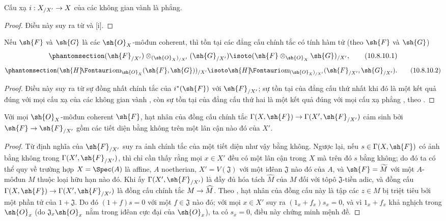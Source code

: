 \documentclass[oneside]{amsart}
\makeatletter
\newcommand{\ega@arrow}[2]{\mathchoice{#1}{#2}{#2}{#2}}
\renewcommand{\to}{\ega@arrow{\longrightarrow}{\rightarrow}}
\newcommand*{\ega@sheafop}[3]{\sh{#1}#2\textup{\kern-2.2pt{\Fontauri\slshape #3}}}
\newcommand*{\shHom}{\ega@sheafop{H}{}{om}}
\let\EGAOriginalLabel\label
\renewcommand{\label}[1]{\phantomsection\EGAOriginalLabel{#1}}
\makeatother
\begin{document}
\begin{corollary}[10.8.9]
\label{I.10.8.9}
Cấu xạ $i:X_{/X'}\to X$ của các không gian vành là phẳng.
\end{corollary}

\begin{proof}
Điều này suy ra từ  và [i].
\end{proof}

\begin{corollary}[10.8.10]
\label{I.10.8.10}
Nếu $\sh{F}$ và $\sh{G}$ là các $\sh{O}_X$-môđun coherent, thì tồn tại các đẳng cấu chính tắc có tính hàm tử (theo $\sh{F}$ và $\sh{G}$)
\[
\label{I.10.8.10.1}
  (\sh{F}_{/X'})\otimes_{(\sh{O}_X)_{/X'}}(\sh{G}_{/X'})\isoto(\sh{F}\otimes_{\sh{O}_X}\sh{G})_{/X'},
  \tag{10.8.10.1}
\]
\[
\label{I.10.8.10.2}
  (\shHom_{\sh{O}_X}(\sh{F},\sh{G}))_{/X'}\isoto\shHom_{(\sh{O}_X)_{/X'}}(\sh{F}_{/X'},\sh{G}_{/X'}).
  \tag{10.8.10.2}
\]
\end{corollary}

\begin{proof}
Điều này suy ra từ sự đồng nhất chính tắc của $i^*(\sh{F})$ với $\sh{F}_{/X'}$; sự tồn tại của đẳng cấu thứ nhất khi đó là một kết quả đúng với mọi cấu xạ của các không gian vành , còn sự tồn tại của đẳng cấu thứ hai là một kết quả đúng với mọi cấu xạ phẳng , theo .
\end{proof}

\begin{proposition}[10.8.11]
\label{I.10.8.11}
Với mọi $\sh{O}_X$-môđun coherent $\sh{F}$, hạt nhân của đồng cấu chính tắc $\Gamma(X,\sh{F})\to\Gamma(X',\sh{F}_{/X'})$ cảm sinh bởi $\sh{F}\to\sh{F}_{/X'}$ gồm các tiết diện bằng không trên một lân cận nào đó của $X'$.
\end{proposition}

\begin{proof}
Từ định nghĩa của $\sh{F}_{/X'}$ suy ra ảnh chính tắc của một tiết diện như vậy bằng không.
Ngược lại, nếu $s\in\Gamma(X,\sh{F})$ có ảnh bằng không trong $\Gamma(X',\sh{F}_{/X'})$, thì chỉ cần thấy rằng mọi $x\in X'$ đều có một lân cận trong $X$ mà trên đó $s$ bằng không; do đó ta có thể quy về trường hợp $X=\Spec(A)$ là affine, $A$ noetherian, $X'=V(\mathfrak{J})$ với một iđêan $\mathfrak{J}$ nào đó của $A$, và $\sh{F}=\widetilde{M}$ với một $A$-môđun $M$ thuộc loại hữu hạn nào đó.
Khi ấy $\Gamma(X',\sh{F}_{/X'})$ là đầy đủ hóa tách $\widehat{M}$ của $M$ đối với tôpô $\mathfrak{J}$-tiền adic, và đồng cấu $\Gamma(X,\sh{F})\to\Gamma(X',\sh{F}_{/X'})$ là đồng cấu chính tắc $M\to\widehat{M}$.
Theo , hạt nhân của đồng cấu này là tập các $z\in M$ bị triệt tiêu bởi một phần tử của $1+\mathfrak{J}$.
Do đó $(1+f)s=0$ với một $f\in\mathfrak{J}$ nào đó; với mọi $x\in X'$ suy ra $(1_x+f_x)s_x=0$, và vì $1_x+f_x$ khả nghịch trong $\sh{O}_x$ (do $\mathfrak{J}_x\sh{O}_x$ nằm trong iđêan cực đại của $\sh{O}_x$), ta có $s_x=0$, điều này chứng minh mệnh đề.
\end{proof}
\end{document}
